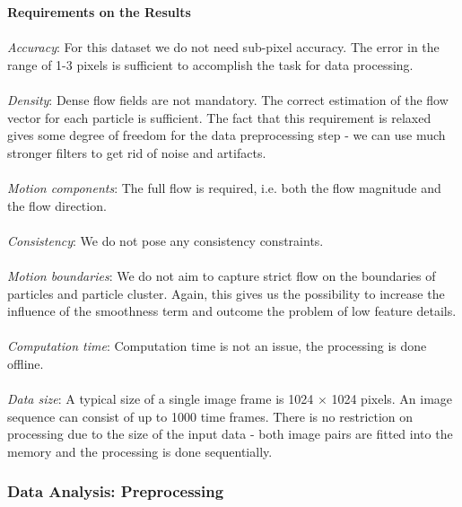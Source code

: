 \textbf{Requirements on the Results}
\\
\\
\textit{Accuracy}: For this dataset we do not need sub-pixel accuracy. The error in the range of 1-3 pixels is sufficient to accomplish the task for data processing.
\\
\\
\textit{Density}: Dense flow fields are not mandatory. The correct estimation of the flow vector for each particle is sufficient. The fact that this requirement is relaxed gives some degree of freedom for the data preprocessing step - we can use much stronger filters to get rid of noise and artifacts. 
\\
\\
\textit{Motion components}: The full flow is required, i.e. both the flow magnitude and the flow direction. 
\\
\\
\textit{Consistency}: We do not pose any consistency constraints.
\\
\\
\textit{Motion boundaries}: We do not aim to capture strict flow on the boundaries of particles and particle cluster. Again, this gives us the possibility to increase the influence of the smoothness term and outcome the problem of low feature details.
\\
\\
\textit{Computation time}: Computation time is not an issue, the processing is done offline.
\\
\\
\textit{Data size}: A typical size of a single image frame is 1024 $\times$ 1024 pixels. An image sequence can consist of up to 1000 time frames. There is no restriction on processing due to the size of the input data - both image pairs are fitted into the memory and the processing is done sequentially.    


 

\subsubsection{Data Analysis: Preprocessing}


